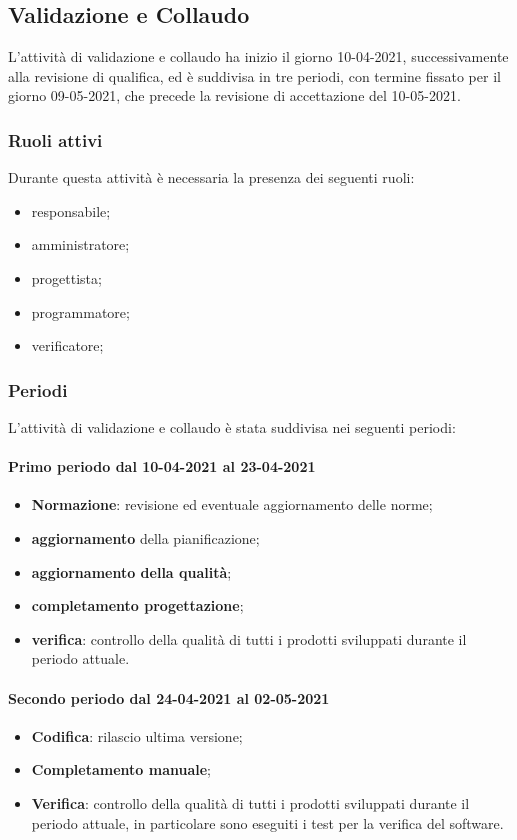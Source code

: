 	\newpage

	\subsection{Validazione e Collaudo}
	L'attività di validazione e collaudo ha inizio il giorno 10-04-2021, successivamente alla revisione di
	qualifica, ed è suddivisa in tre periodi, con termine fissato per il giorno 09-05-2021, che precede la
	revisione di accettazione del 10-05-2021.
	
	\subsubsection{Ruoli attivi}
	Durante questa attività è necessaria la presenza dei seguenti ruoli:
	\begin{itemize}
		\item responsabile;
		\item amministratore;
		\item progettista;
		\item programmatore;
		\item verificatore;
	\end{itemize}

	\subsubsection{Periodi}
	L'attività di validazione e collaudo è stata suddivisa nei seguenti periodi:
	\paragraph{Primo periodo dal 10-04-2021 al 23-04-2021}
	\begin{itemize}
		\item \textbf{Normazione}: revisione ed eventuale aggiornamento delle norme;
		\item \textbf{aggiornamento} della pianificazione;
		\item \textbf{aggiornamento della qualità};
		\item \textbf{completamento progettazione};
		\item \textbf{verifica}: controllo della qualità di tutti i prodotti sviluppati durante il periodo attuale.
	\end{itemize}

	\paragraph{Secondo periodo dal 24-04-2021 al 02-05-2021}
	\begin{itemize}
		\item \textbf{Codifica}: rilascio ultima versione;
		\item \textbf{Completamento manuale};
		\item \textbf{Verifica}: controllo della qualità di tutti i prodotti sviluppati durante il periodo attuale, in
		particolare sono eseguiti i test per la verifica del software.
	\end{itemize}

